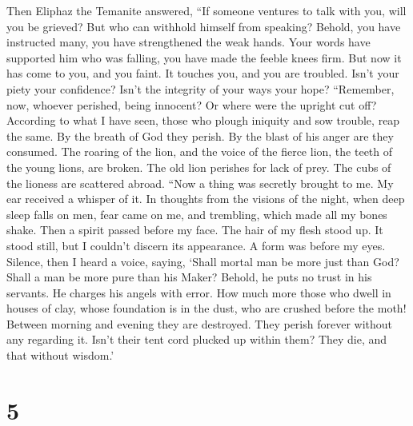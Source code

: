  Then Eliphaz the Temanite answered,  ``If
someone ventures to talk with you, will you be grieved? But who can
withhold himself from speaking?  Behold, you have instructed
many, you have strengthened the weak hands.  Your words have
supported him who was falling, you have made the feeble knees firm.
 But now it has come to you, and you faint. It touches you,
and you are troubled.  Isn't your piety your confidence?
Isn't the integrity of your ways your hope?  ``Remember,
now, whoever perished, being innocent? Or where were the upright cut
off?  According to what I have seen, those who plough
iniquity and sow trouble, reap the same.  By the breath of
God they perish. By the blast of his anger are they consumed.
 The roaring of the lion, and the voice of the fierce lion,
the teeth of the young lions, are broken.  The old lion
perishes for lack of prey. The cubs of the lioness are scattered abroad.
 ``Now a thing was secretly brought to me. My ear received
a whisper of it.  In thoughts from the visions of the
night, when deep sleep falls on men,  fear came on me, and
trembling, which made all my bones shake.  Then a spirit
passed before my face. The hair of my flesh stood up.  It
stood still, but I couldn't discern its appearance. A form was before my
eyes. Silence, then I heard a voice, saying,  `Shall mortal
man be more just than God? Shall a man be more pure than his Maker?
 Behold, he puts no trust in his servants. He charges his
angels with error.  How much more those who dwell in houses
of clay, whose foundation is in the dust, who are crushed before the
moth!  Between morning and evening they are destroyed. They
perish forever without any regarding it.  Isn't their tent
cord plucked up within them? They die, and that without wisdom.'

\hypertarget{section-4}{%
\section{5}\label{section-4}}


